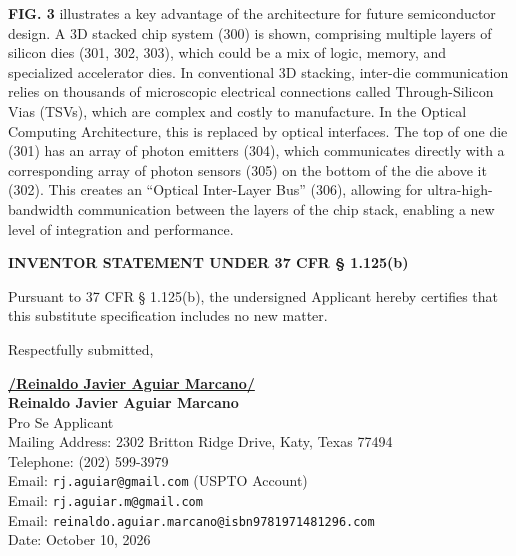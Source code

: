 \documentclass[11pt,letterpaper]{article}
\begin{document}
\textbf{FIG. 3} illustrates a key advantage of the architecture for future semiconductor design. A 3D stacked chip system (300) is shown, comprising multiple layers of silicon dies (301, 302, 303), which could be a mix of logic, memory, and specialized accelerator dies. In conventional 3D stacking, inter-die communication relies on thousands of microscopic electrical connections called Through-Silicon Vias (TSVs), which are complex and costly to manufacture. In the Optical Computing Architecture, this is replaced by optical interfaces. The top of one die (301) has an array of photon emitters (304), which communicates directly with a corresponding array of photon sensors (305) on the bottom of the die above it (302). This creates an ``Optical Inter-Layer Bus'' (306), allowing for ultra-high-bandwidth communication between the layers of the chip stack, enabling a new level of integration and performance.

\vspace{0.8cm}
\begin{center}
    \textbf{\large INVENTOR STATEMENT UNDER 37 CFR \S{} 1.125(b)}
\end{center}

Pursuant to 37 CFR \S{} 1.125(b), the undersigned Applicant hereby certifies that this substitute specification includes no new matter.

\vspace{0.6cm}
\begin{singlespace}
\noindent Respectfully submitted, \par\vspace{1.0cm}
\underline{\textbf{/Reinaldo Javier Aguiar Marcano/}} \\
\textbf{Reinaldo Javier Aguiar Marcano} \\
Pro Se Applicant \\
Mailing Address: 2302 Britton Ridge Drive, Katy, Texas 77494 \\
Telephone: (202) 599-3979 \\
Email: \texttt{rj.aguiar@gmail.com} (USPTO Account) \\
Email: \texttt{rj.aguiar.m@gmail.com} \\
Email: \texttt{reinaldo.aguiar.marcano@isbn9781971481296.com} \\
Date: October 10, 2026
\end{singlespace}
\end{document}
